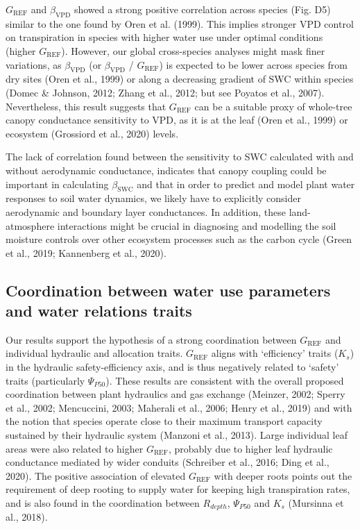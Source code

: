\documentclass[11pt,twoside]{reedthesis}
\begin{document}
\(G_{\text{REF}}\) and \(\beta_{\text{VPD}}\) showed a strong positive
correlation across species (Fig. D5) similar to the one found by Oren et
al. (1999). This implies stronger VPD control on transpiration in
species with higher water use under optimal conditions (higher
\(G_{\text{REF}}\)). However, our global cross-species analyses might
mask finer variations, as \(\beta_{\text{VPD}}\) (or
\(\beta_{\text{VPD}}\) / \(G_{\text{REF}}\)) is expected to be lower
across species from dry sites (Oren et al., 1999) or along a decreasing
gradient of SWC within species (Domec \& Johnson, 2012; Zhang et al.,
2012; but see Poyatos et al., 2007). Nevertheless, this result suggests
that \(G_{\text{REF}}\) can be a suitable proxy of whole-tree canopy
conductance sensitivity to VPD, as it is at the leaf (Oren et al., 1999)
or ecosystem (Grossiord et al., 2020) levels.\par

The lack of correlation found between the sensitivity to SWC calculated
with and without aerodynamic conductance, indicates that canopy coupling
could be important in calculating \(\beta_{\text{SWC}}\) and that in
order to predict and model plant water responses to soil water dynamics,
we likely have to explicitly consider aerodynamic and boundary layer
conductances. In addition, these land-atmosphere interactions might be
crucial in diagnosing and modelling the soil moisture controls over
other ecosystem processes such as the carbon cycle (Green et al., 2019;
Kannenberg et al., 2020).\par

\subsection{Coordination between water use parameters and water
relations
traits}\label{coordination-between-water-use-parameters-and-water-relations-traits}

Our results support the hypothesis of a strong coordination between
\(G_{\text{REF}}\) and individual hydraulic and allocation traits.
\(G_{\text{REF}}\) aligns with `efficiency' traits (\(K_s\)) in the
hydraulic safety-efficiency axis, and is thus negatively related to
`safety' traits (particularly \(\Psi_{P50}\)). These results are
consistent with the overall proposed coordination between plant
hydraulics and gas exchange (Meinzer, 2002; Sperry et al., 2002;
Mencuccini, 2003; Maherali et al., 2006; Henry et al., 2019) and with
the notion that species operate close to their maximum transport
capacity sustained by their hydraulic system (Manzoni et al., 2013).
Large individual leaf areas were also related to higher
\(G_{\text{REF}}\), probably due to higher leaf hydraulic conductance
mediated by wider conduits (Schreiber et al., 2016; Ding et al., 2020).
The positive association of elevated \(G_{\text{REF}}\) with deeper
roots points out the requirement of deep rooting to supply water for
keeping high transpiration rates, and is also found in the coordination
between \(R_{depth}\), \(\Psi_{P50}\) and \(K_s\) (Mursinna et al.,
2018).\par
\end{document}
